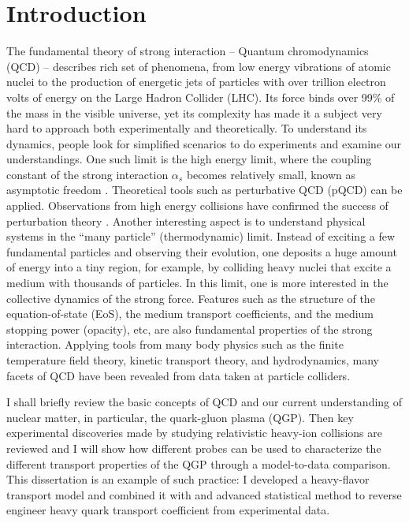 \chapter{Introduction}
\label{chapter:introduction}
The fundamental theory of strong interaction -- Quantum chromodynamics (QCD) -- describes rich set of phenomena, from low energy vibrations of atomic nuclei to the production of energetic jets of particles with over trillion electron volts of energy on the Large Hadron Collider (LHC).
Its force binds over 99\% of the mass in the visible universe, yet its complexity has made it a subject very hard to approach both experimentally and theoretically.
To understand its dynamics, people look for simplified scenarios to do experiments and examine our understandings.
One such limit is the high energy limit, where the coupling constant of the strong interaction $\alpha_s$ becomes relatively small, known as asymptotic freedom \cite{Gross:1973id,Politzer:1973fx}. 
Theoretical tools such as perturbative QCD (pQCD) can be applied.
Observations from high energy collisions have confirmed the success of perturbation theory \cite{RevModPhys.59.465}.
Another interesting aspect is to understand physical systems in the ``many particle'' (thermodynamic) limit.
Instead of exciting a few fundamental particles and observing their evolution, one deposits a huge amount of energy into a tiny region, for example, by colliding heavy nuclei that excite a medium with thousands of particles. 
In this limit, one is more interested in the collective dynamics of the strong force.
Features such as the structure of the equation-of-state (EoS), the medium transport coefficients, and the medium stopping power (opacity), etc, are also fundamental properties of the strong interaction.
Applying tools from many body physics such as the finite temperature field theory, kinetic transport theory, and hydrodynamics, many facets of QCD have been revealed from data taken at particle colliders.

I shall briefly review the basic concepts of QCD and our current understanding of nuclear matter, in particular, the quark-gluon plasma (QGP). 
Then key experimental discoveries made by studying relativistic heavy-ion collisions are reviewed and I will show how different probes can be used to characterize the different transport properties of the QGP through a model-to-data comparison.
This dissertation is an example of such practice: I developed a heavy-flavor transport model and combined it with and advanced statistical method to reverse engineer heavy quark transport coefficient from experimental data.

